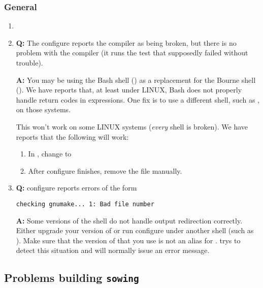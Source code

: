 \documentclass[11pt,twoside]{article}
\def\helpdir{/home/MPI/maint/help/src}
\def\question{{\bf Q: }}
\def\answer{{\bf A: }}
\begin{document}
\subsubsection{General}
\begin{enumerate}
\item 

\item 
\question 
The configure reports the compiler as being broken, but there is
no problem with the compiler (it runs the test that supposedly failed without
trouble).

\answer 
You may be using the Bash shell () as a replacement for
the Bourne shell ().  We have reports that, at least under
LINUX, Bash does not properly handle return codes in expressions.  One fix is
to use a different shell, such as , on those systems.

This won't work on some LINUX systems ({\em every} shell is broken).  We have
reports that the following will work:
\begin{enumerate}
\item In , change  to 
\item After configure finishes, remove the file  manually.
\end{enumerate}

\item 
\question 
configure reports errors of the form
\begin{verbatim} 
checking gnumake... 1: Bad file number
\end{verbatim}

\answer 
Some versions of the  shell do not handle output redirection
correctly.  Either upgrade your version of  or run configure under
another shell (such as ).  Make sure that the version of
 that you use is not an alias for .   
trys to detect this situation and will normally issue an error message.

\end{enumerate}

\subsection{Problems building {\tt sowing}}
\end{document}
